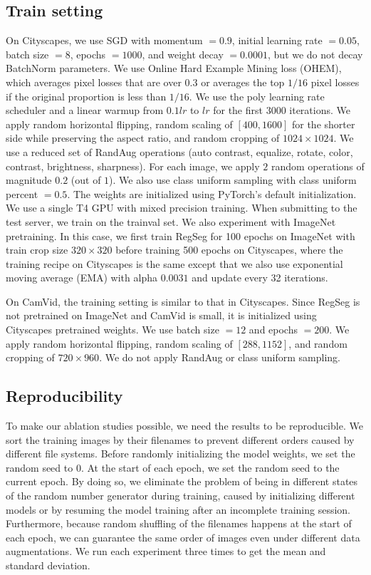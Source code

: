 \documentclass[10pt,twocolumn,letterpaper]{article}
\begin{document}
\subsection{Train setting}
\label{sec:trainingSetting}
On Cityscapes, we use SGD with momentum $=0.9$, initial learning rate $=0.05$, batch size $=8$, epochs $=1000$, and weight decay $=0.0001$, but we do not decay BatchNorm parameters. We use Online Hard Example Mining loss\cite{ohem} (OHEM), which averages pixel losses that are over $0.3$ or averages the top $1/16$ pixel losses if the original proportion is less than $1/16$. We use the poly learning rate scheduler and a linear warmup\cite{warmup} from $0.1lr$ to $lr$ for the first $3000$ iterations. We apply random horizontal flipping, random scaling of $[400, 1600]$ for the shorter side while preserving the aspect ratio, and random cropping of $1024\times 1024$. We use a reduced set of RandAug\cite{cubuk2020randaugment} operations (auto contrast, equalize, rotate, color, contrast, brightness, sharpness). For each image, we apply $2$ random operations of magnitude $0.2$ (out of $1$). We also use class uniform sampling\cite{classUniformSampling} with class uniform percent $=0.5$. The weights are initialized using PyTorch's\cite{pytorch} default initialization. We use a single T4 GPU with mixed precision training. When submitting to the test server, we train on the trainval set. We also experiment with ImageNet\cite{deng2009imagenet} pretraining. In this case, we first train RegSeg for 100 epochs on ImageNet with train crop size $320\times 320$ before training 500 epochs on Cityscapes, where the training recipe on Cityscapes is the same except that we also use exponential moving average (EMA) with alpha $0.0031$ and update every 32 iterations.

On CamVid, the training setting is similar to that in Cityscapes. Since RegSeg is not pretrained on ImageNet and CamVid is small, it is initialized using Cityscapes pretrained weights. We use batch size $=12$ and epochs $=200$. We apply random horizontal flipping, random scaling of $[288, 1152]$, and random cropping of $720\times 960$. We do not apply RandAug or class uniform sampling.

\subsection{Reproducibility}

To make our ablation studies possible, we need the results to be reproducible. We sort the training images by their filenames to prevent different orders caused by different file systems. Before randomly initializing the model weights, we set the random seed to $0$. At the start of each epoch, we set the random seed to the current epoch. By doing so, we eliminate the problem of being in different states of the random number generator during training, caused by initializing different models or by resuming the model training after an incomplete training session. Furthermore, because random shuffling of the filenames happens at the start of each epoch, we can guarantee the same order of images even under different data augmentations. We run each experiment three times to get the mean and standard deviation. 
\end{document}
